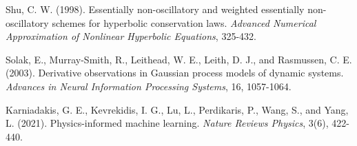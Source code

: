 \documentclass{article}
\begin{document}
\begin{thebibliography}{99}
 Shu, C. W. (1998). Essentially non-oscillatory and weighted essentially non-oscillatory schemes for hyperbolic conservation laws. \textit{Advanced Numerical Approximation of Nonlinear Hyperbolic Equations}, 325-432.



 Solak, E., Murray-Smith, R., Leithead, W. E., Leith, D. J., and Rasmussen, C. E. (2003). Derivative observations in Gaussian process models of dynamic systems. \textit{Advances in Neural Information Processing Systems}, 16, 1057-1064.

 Karniadakis, G. E., Kevrekidis, I. G., Lu, L., Perdikaris, P., Wang, S., and Yang, L. (2021). Physics-informed machine learning. \textit{Nature Reviews Physics}, 3(6), 422-440.

\end{thebibliography}
\end{document}

